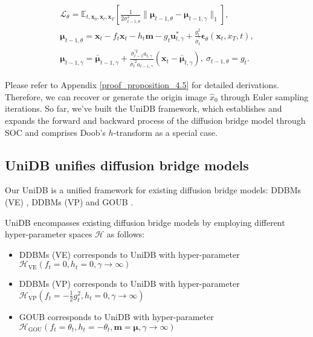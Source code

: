 \begin{equation}\label{objective_function}
\begin{gathered}
\mathcal{L}_{\theta} = \mathbb{E}_{t, \mathbf{x}_0, \mathbf{x}_t, \mathbf{x}_T} \left[ \frac{1}{2\sigma_{t-1, \theta}^2} \big \| \boldsymbol{\mu}_{t-1, \theta} - \boldsymbol{\mu}_{t-1, \gamma} \big \|_1 \right], \\
\boldsymbol{\mu}_{t-1, \theta} = \mathbf{x}_{t} - f_t \mathbf{x}_t - h_t \mathbf{m} - g_t \mathbf{u}_{t, \gamma}^{*} + \frac{g^2_t}{\bar{\sigma}_{t}^{\prime}} \boldsymbol{\epsilon}_{\theta}(\mathbf{x}_t, x_T, t), \\
\boldsymbol{\mu}_{t-1, \gamma} = \bar{\boldsymbol{\mu}}_{t-1, \gamma} + \frac{\bar{\sigma}_{t-1}^{\prime2}a_{t, \gamma}}{\bar{\sigma}_{t}^{\prime2}a_{t-1, \gamma} } (\mathbf{x}_t - \bar{\boldsymbol{\mu}}_{t, \gamma}),\ \sigma_{t-1, \theta} = g_t.
\end{gathered}
\end{equation}

Please refer to Appendix \ref{proof_proposition_4.5} for detailed derivations. Therefore, we can recover or generate the origin image $\hat{x}_0$ through Euler sampling iterations. So far, we've built the UniDB framework, which establishes and expands the forward and backward process of the diffusion bridge model through SOC and comprises Doob's $h$-transform as a special case. 


\subsection{UniDB unifies diffusion bridge models}
Our UniDB is a unified framework for existing diffusion bridge models: DDBMs (VE) \cite{zhou2023denoisingdiffusionbridgemodels}, DDBMs (VP) \cite{zhou2023denoisingdiffusionbridgemodels} and GOUB \cite{yue2024imagerestorationgeneralizedornsteinuhlenbeck}.  
\begin{proposition}\label{proposition_4.4} UniDB encompasses existing diffusion bridge models by employing different hyper-parameter spaces $\mathcal{H}$ as follows:
\begin{itemize}


\item DDBMs (VE) corresponds to UniDB with hyper-parameter $\mathcal{H}_\text{VE}(f_t=0, h_t=0, \gamma \rightarrow \infty)$


\item DDBMs (VP) corresponds to UniDB with hyper-parameter $\mathcal{H}_\text{VP}(f_t=-\frac{1}{2} g^2_t, h_t=0, \gamma \rightarrow \infty)$


\item GOUB corresponds to UniDB with hyper-parameter $\mathcal{H}_\text{GOU}(f_t=\theta_t, h_t=-\theta_t, \mathbf{m} = \boldsymbol{\mu}, \gamma \rightarrow \infty)$
\end{itemize}
\end{proposition}


